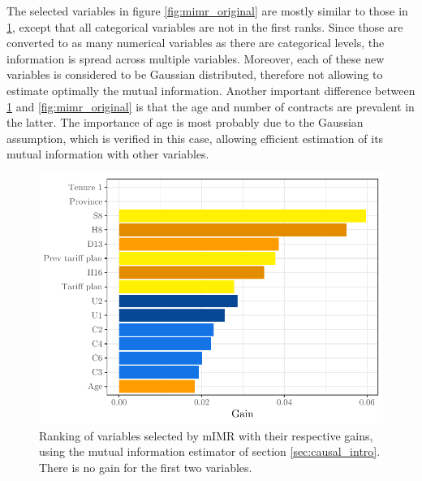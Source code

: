 The selected variables in figure \ref{fig:mimr_original} are mostly similar to
those in \ref{fig:mimr_perso}, except that all categorical variables are not in
the first ranks. Since those are converted to as many numerical variables as
there are categorical levels, the information is spread across multiple
variables. Moreover, each of these new variables is considered to be Gaussian
distributed, therefore not allowing to estimate optimally the mutual
information. Another important difference between \ref{fig:mimr_perso} and
\ref{fig:mimr_original} is that the age and number of contracts are prevalent in
the latter. The importance of age is most probably due to the Gaussian
assumption, which is verified in this case, allowing efficient estimation of its
mutual information with other variables.

\begin{figure}
    \centering
    \includegraphics[width=0.9\linewidth]{figures/mimr_perso.pdf}
    \caption{Ranking of variables selected by mIMR with their respective gains,
    using the mutual information estimator of section \ref{sec:causal_intro}.
    There is no gain for the first two variables.}
    \label{fig:mimr_perso}
\end{figure}

